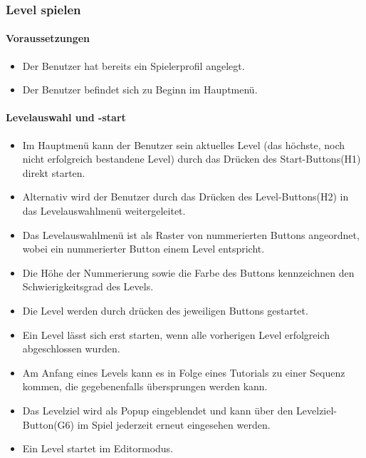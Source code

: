 \subsubsection{Level spielen}
\paragraph{Voraussetzungen}
\begin{itemize}
	\item Der Benutzer hat bereits ein Spielerprofil angelegt.
	\item Der Benutzer befindet sich zu Beginn im Hauptmenü.
\end{itemize}
\paragraph{Levelauswahl und -start}
\begin{itemize}
	\item Im Hauptmenü kann der Benutzer sein aktuelles Level (das höchste, noch nicht erfolgreich bestandene Level) durch das Drücken des Start-Buttons(H1) direkt starten.
	\item Alternativ wird der Benutzer durch das Drücken des Level-Buttons(H2) in das Levelauswahlmenü weitergeleitet.
	\item Das Levelauswahlmenü ist als Raster von nummerierten Buttons angeordnet, wobei ein nummerierter Button einem Level entspricht.
	\item Die Höhe der Nummerierung sowie die Farbe des Buttons kennzeichnen den Schwierigkeitsgrad des Levels.
	\item Die Level werden durch drücken des jeweiligen Buttons gestartet.
	\item Ein Level lässt sich erst starten, wenn alle vorherigen Level erfolgreich abgeschlossen wurden.
	\item Am Anfang eines Levels kann es in Folge eines Tutorials zu einer Sequenz kommen, die gegebenenfalls übersprungen werden kann.
	\item Das Levelziel wird als Popup eingeblendet und kann über den Levelziel-Button(G6) im Spiel jederzeit erneut eingesehen werden.
	\item Ein Level startet im Editormodus.
\end{itemize}
